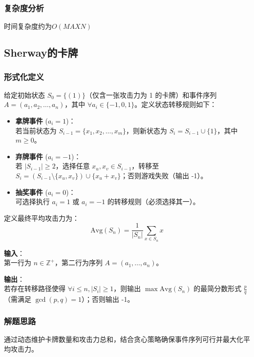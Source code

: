 \documentclass[../mainReport.tex]{subfiles}
\begin{document}
\subsubsection{复杂度分析}
时间复杂度约为$O(MAXN)$

\subsection{Sherway的卡牌}
\subsubsection{形式化定义}
给定初始状态 $S_0 = \{(1)\}$（仅含一张攻击力为 1 的卡牌）和事件序列 $A = (a_1, a_2, \ldots, a_n)$，其中 $\forall a_i \in \{-1, 0, 1\}$。定义状态转移规则如下：

\begin{itemize}
    \item \textbf{拿牌事件} ($a_i = 1$)：\\
    若当前状态为 $S_{i-1} = \{x_1, x_2, \ldots, x_m\}$，则新状态为 $S_i = S_{i-1} \cup \{1\}$，其中 $m \geq 0$。

    \item \textbf{弃牌事件} ($a_i = -1$)：\\
    若 $|S_{i-1}| \geq 2$，选择任意 $x_u, x_v \in S_{i-1}$，转移至 $S_i = (S_{i-1} \setminus \{x_u, x_v\}) \cup \{x_u + x_v\}$；否则游戏失败（输出 -1）。

    \item \textbf{抽奖事件} ($a_i = 0$)：\\
    可选择执行 $a_i = 1$ 或 $a_i = -1$ 的转移规则（必须选择其一）。
\end{itemize}

\noindent 定义最终平均攻击力为：
$$
\text{Avg}(S_n) = \frac{1}{|S_n|}\sum_{x \in S_n} x
$$

\noindent \textbf{输入}：\\
第一行为 $n \in \mathbb{Z}^+$，第二行为序列 $A = (a_1, \ldots, a_n)$。

\noindent \textbf{输出}：\\
若存在转移路径使得 $\forall i \leq n, |S_i| \geq 1$，则输出 $\max \text{Avg}(S_n)$ 的最简分数形式 $\frac{p}{q}$（需满足 $\gcd(p,q)=1$）；否则输出 -1。

\subsubsection{解题思路}
通过动态维护卡牌数量和攻击力总和，结合贪心策略确保事件序列可行并最大化平均攻击力。
\end{document}
